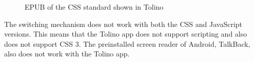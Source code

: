 \begin{figure}[h]
	\centering
	\caption{EPUB of the CSS standard shown in Tolino}
	\label{fig:tolino}
\end{figure}

The switching mechanism does not work with both the CSS and JavaScript versions. This means that the Tolino app does not support scripting and also does  not support CSS 3. The preinstalled screen reader of Android, TalkBack, also does not work with the Tolino app.

